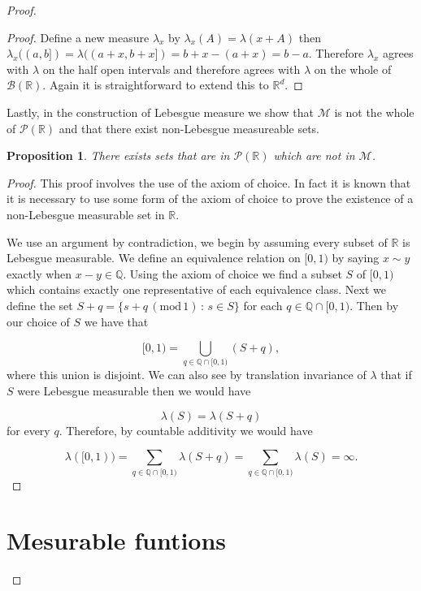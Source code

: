 \documentclass[
]{book}
\newtheorem{proposition}{Proposition}[chapter]
\theoremstyle{definition}
\theoremstyle{definition}
\theoremstyle{definition}
\theoremstyle{definition}
\theoremstyle{remark}
\begin{document}
\begin{proof}
\begin{proof}
Define a new measure \(\lambda_x\) by \(\lambda_x(A) = \lambda(x+A)\) then \(\lambda_x((a,b]) = \lambda((a+x,b+x]) = b+x -(a+x) = b-a\). Therefore \(\lambda_x\) agrees with \(\lambda\) on the half open intervals and therefore agrees with \(\lambda\) on the whole of \(\mathcal{B}(\mathbb{R})\). Again it is straightforward to extend this to \(\mathbb{R}^d\).
\end{proof}

Lastly, in the construction of Lebesgue measure we show that \(\mathscr{M}\) is not the whole of \(\mathscr{P}(\mathbb{R})\) and that there exist non-Lebesgue measureable sets.

\begin{proposition}
There exists sets that are in \(\mathscr{P}(\mathbb{R})\) which are not in \(\mathscr{M}\).
\end{proposition}

\begin{proof}
This proof involves the use of the axiom of choice. In fact it is known that it is necessary to use some form of the axiom of choice to prove the existence of a non-Lebesgue measurable set in \(\mathbb{R}\).

We use an argument by contradiction, we begin by assuming every subset of \(\mathbb{R}\) is Lebesgue measurable. We define an equivalence relation on \([0,1)\) by saying \(x \sim y\) exactly when \(x-y \in \mathbb{Q}\). Using the axiom of choice we find a subset \(S\) of \([0,1)\) which contains exactly one representative of each equivalence class. Next we define the set \(S+q = \{ s+q \, (\mbox{mod}\,1) \, : \, s \in S \}\) for each \(q \in \mathbb{Q} \cap [0,1)\). Then by our choice of \(S\) we have that

\[ [0,1) = \bigcup_{q \in \mathbb{Q} \cap [0,1)} (S+q), \]
where this union is disjoint. We can also see by translation invariance of \(\lambda\) that if \(S\) were Lebesgue measurable then we would have

\[ \lambda(S) = \lambda(S+q) \]
for every \(q\). Therefore, by countable additivity we would have

\[ \lambda([0,1)) = \sum_{q \in \mathbb{Q} \cap [0,1)} \lambda (S+q) = \sum_{q \in \mathbb{Q} \cap [0,1)} \lambda(S) = \infty. \]
\end{proof}

\hypertarget{mesurable-funtions}{%
\chapter{Mesurable funtions}\label{mesurable-funtions}}


\end{proof}
\end{document}
